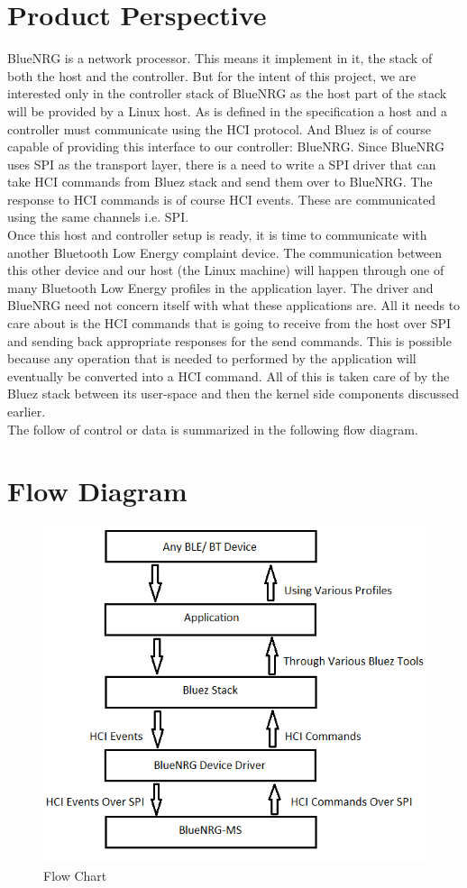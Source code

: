 \section{Product Perspective}
BlueNRG is a network processor. This means it implement in it, the stack of both the host and the controller. But for the intent of this project, we are interested only in the controller stack of BlueNRG as the host part of the stack will be provided by a Linux host. As is defined in the specification a host and a controller must communicate using the HCI protocol. And Bluez is of course capable of providing this interface to our controller: BlueNRG. Since BlueNRG uses SPI as the transport layer, there is a need to write a SPI driver that can take HCI commands from Bluez stack and send them over to BlueNRG. The response to HCI commands is of course HCI events. These are communicated using the same channels i.e. SPI. \\
Once this host and controller setup is ready, it is time to communicate with another Bluetooth Low Energy complaint device. The communication between this other device and our host (the Linux machine) will happen through one of many Bluetooth Low Energy profiles in the application layer. The driver and BlueNRG need not concern itself with what these applications are. All it needs to care about is the HCI commands that is going to receive from the host over SPI and sending back appropriate responses for the send commands. This is possible because any operation that is needed to performed by the application will eventually be converted into a HCI command. All of this is taken care of by the Bluez stack between its user-space and then the kernel side components discussed earlier. \\
The follow of control or data is summarized in the following flow diagram.
\section{Flow Diagram}
\begin{figure}[ht]
	\centering
	\includegraphics[scale=0.5]{images/flow_chart.png}
	\caption{Flow Chart}
\end{figure}
